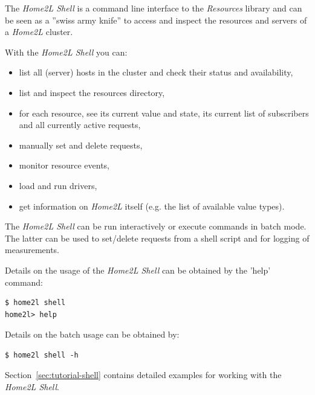 \documentclass[12pt,english,parskip=half]{scrreprt}
\begin{document}
The \emph{Home2L Shell} is a command line interface to the \emph{Resources} library
and can be seen as a ''swiss army knife'' to access and inspect the resources
and servers of a \emph{Home2L} cluster.

With the \emph{Home2L Shell} you can:
\begin{itemize}
  \item list all (server) hosts in the cluster and check their status and availability,
  \item list and inspect the resources directory,
  \item for each resource, see its current value and state, its current list of subscribers and
  all currently active requests,
  \item manually set and delete requests,
  \item monitor resource events,
  \item load and run drivers,
  \item get information on \emph{Home2L} itself (e.g. the list of available value types).
\end{itemize}

The \emph{Home2L Shell} can be run interactively or execute commands in batch mode.
The latter can be used to set/delete requests from a shell script and for logging
of measurements.

Details on the usage of the \emph{Home2L Shell} can be obtained by the 'help' command:
\begin{lstlisting}
$ home2l shell
home2l> help
\end{lstlisting}

Details on the batch usage can be obtained by:
\begin{lstlisting}
$ home2l shell -h
\end{lstlisting}

Section~\ref{sec:tutorial-shell} contains detailed examples for working with the \emph{Home2L Shell}.





%
%
\end{document}
